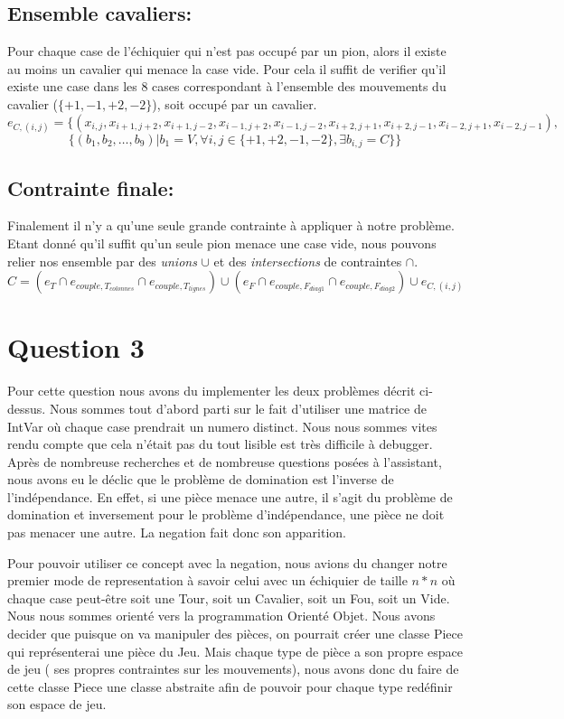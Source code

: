 \documentclass[a4paper,10pt]{article}
\begin{document}
	\subsection{Ensemble cavaliers:}
			Pour chaque case de l'échiquier qui n'est pas occupé par un pion, alors il existe au moins un cavalier qui menace la case vide. Pour cela il suffit de verifier qu'il existe une case dans les 8 cases correspondant à l'ensemble des mouvements du cavalier ($\{+1,-1,+2,-2\}$), soit occupé par un cavalier.
	$$ e_{C,(i,j)} = \{(x_{i,j}, x_{i+1,j+2}, x_{i+1,j-2}, x_{i-1,j+2}, x_{i-1,j-2}, x_{i+2,j+1}, x_{i+2,j-1}, x_{i-2,j+1}, x_{i-2,j-1}),$$ $$\{(b_1, b_2, \ldots, b_9)|b_1 = V, \forall i,j \in \{+1,+2,-1,-2\}, \exists b_{i,j} = C\}\} $$

	\subsection{Contrainte finale:}
		Finalement il n'y a qu'une seule grande contrainte à appliquer à notre problème. Etant donné qu'il suffit qu'un seule pion menace une case vide, nous pouvons relier nos ensemble par des \emph{unions} $\cup$ et des \emph{intersections} de contraintes $\cap$. 
	$$ C = (e_T \cap e_{couple,T_{colonnes}} \cap e_{couple,T_{lignes}}) \cup (e_F \cap e_{couple,F_{diag1}} \cap e_{couple,F_{diag2}}) \cup e_{C,(i,j)}$$

\section{Question 3}
\par Pour cette question nous avons du implementer les deux problèmes décrit ci-dessus. Nous sommes tout d'abord parti sur le fait d'utiliser une matrice de IntVar où chaque case prendrait un numero distinct. Nous nous sommes vites rendu compte que cela n'était pas du tout lisible est très difficile à debugger. Après de nombreuse recherches et de nombreuse questions posées à l'assistant, nous avons eu le déclic que le problème de domination est l'inverse de l'indépendance. En effet, si une pièce menace une autre, il s'agit du problème de domination et inversement pour le problème d'indépendance, une pièce ne doit pas menacer une autre. La negation fait donc son apparition.
\par Pour pouvoir utiliser ce concept avec la negation, nous avions du changer notre premier mode de representation à savoir celui avec un échiquier de taille $n*n$ où chaque case peut-être soit une Tour, soit un Cavalier, soit un Fou, soit un Vide. Nous nous sommes orienté vers la programmation Orienté Objet. Nous avons decider que puisque on va manipuler des pièces, on pourrait créer une classe Piece qui représenterai une pièce du Jeu. Mais chaque type de pièce a son propre espace de jeu ( ses propres contraintes sur les mouvements), nous avons donc du faire de cette classe Piece une classe abstraite afin de pouvoir pour chaque type redéfinir son espace de jeu.
	
\end{document}
